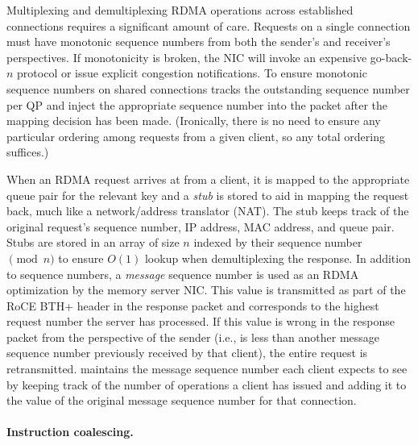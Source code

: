 Multiplexing and demultiplexing RDMA operations across established
connections requires a significant amount of care. Requests on a
single connection must have monotonic sequence numbers from both the
sender's and receiver's perspectives. If monotonicity is broken, the
NIC will invoke an expensive go-back-$n$ protocol or issue explicit
congestion notifications. To ensure monotonic sequence numbers on
shared connections {\sword} tracks the outstanding sequence number per QP and
inject the appropriate sequence number into the packet after the
mapping decision has been made.  (Ironically, there is no need to
ensure any particular ordering among requests from a given client, so
any total ordering suffices.)

When an RDMA request arrives at {\sword} from a client, it is
mapped to the appropriate queue pair for the relevant key and a
\emph{stub} is stored to aid in mapping the request back, much like a
network/address translator (NAT). The stub keeps track of the original
request's sequence number, IP address, MAC address, and queue
pair. Stubs are stored in an array of size $n$ indexed by their
sequence number $\pmod n$ to ensure $O(1)$ lookup when demultiplexing
the response.
In addition to sequence numbers, a \emph{message} sequence number
is used as an RDMA optimization by the memory server NIC. This value
is transmitted as part of the RoCE BTH+ header in the response packet
and corresponds to the highest request number the server has
processed. If this value is wrong in the response packet from the
perspective of the sender (i.e., is less than another message sequence
number previously received by that client), the entire request is
retransmitted.  {\sword} maintains the message sequence number each client
expects to see by keeping track of the number of operations a client has
issued and adding it to the value of the original message sequence
number for that connection.

\paragraph{Instruction coalescing.}

